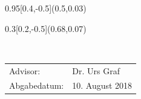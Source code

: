
\begin{titlepage}
  \setlength{\TPHorizModule}{\paperwidth}
  \setlength{\TPVertModule}{\paperheight}
  
  
  
  \begin{textblock}{0.95}[0.4,-0.5](0.5,0.03)
  \end{textblock}
  \begin{textblock}{0.3}[0.2,-0.5](0.68,0.07)
  \end{textblock}
    \vspace*{7cm}
    \begin{center}
      \Huge{\color{HeadBlue}{Java on the bare ARM metal\\}}
    \vspace*{6cm}
    \normalsize
        {}\\
    \vspace*{2cm}       


    \vspace*{3cm}
    \color{HeadBlue}
    \begin{tabular}{p{4cm}l}
      Advisor: & Dr. Urs Graf \\
      Abgabedatum: & 10. August 2018
    \end{tabular}\\
    \end{center}
  \end{titlepage}





